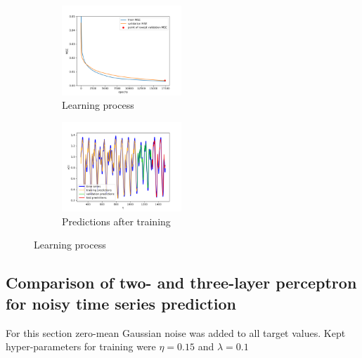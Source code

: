 \documentclass[a4paper]{article}
\begin{document}
\begin{figure}[h!]
	\begin{subfigure}{.5\linewidth}
		\includegraphics[width=170px]{img/4_1_learning_mse.png}
		\centering
		\caption{\small Learning process}
	\end{subfigure}
	\begin{subfigure}{.5\linewidth}
		\centering
		\includegraphics[width=170px]{img/4_1_predictions.png}
		\caption{\small Predictions after training}
	\end{subfigure}
	\caption{Learning process}
	\label{fig:learning_process}
\end{figure}

\subsection{Comparison of two- and three-layer perceptron for noisy time series prediction}
For this section zero-mean Gaussian noise was added to all target values.
Kept hyper-parameters for training were $\eta = 0.15$ and $\lambda = 0.1$

\end{document}
